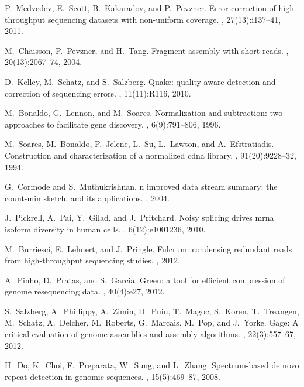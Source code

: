 \documentclass{pnastwo}
\begin{document}
\begin{article}
\begin{thebibliography}{20}
P.~Medvedev, E.~Scott, B.~Kakaradov, and P.~Pevzner.
\newblock Error correction of high-throughput sequencing datasets with
  non-uniform coverage.
, 27(13):i137--41, 2011.

M.~Chaisson, P.~Pevzner, and H.~Tang.
\newblock Fragment assembly with short reads.
, 20(13):2067--74, 2004.

D.~Kelley, M.~Schatz, and S.~Salzberg.
\newblock Quake: quality-aware detection and correction of sequencing errors.
, 11(11):R116, 2010.

M.~Bonaldo, G.~Lennon, and M.~Soares.
\newblock Normalization and subtraction: two approaches to facilitate gene
  discovery.
, 6(9):791--806, 1996.

M.~Soares, M.~Bonaldo, P.~Jelene, L.~Su, L.~Lawton, and A.~Efstratiadis.
\newblock Construction and characterization of a normalized cdna library.
, 91(20):9228--32, 1994.

G.~Cormode and S.~Muthukrishnan.
n improved data stream summary: the count-min sketch, and its
  applications.
, 2004.

J.~Pickrell, A.~Pai, Y.~Gilad, and J.~Pritchard.
\newblock Noisy splicing drives mrna isoform diversity in human cells.
, 6(12):e1001236, 2010.

M.~Burriesci, E.~Lehnert, and J.~Pringle.
\newblock Fulcrum: condensing redundant reads from high-throughput sequencing
  studies.
, 2012.

A.~Pinho, D.~Pratas, and S.~Garcia.
\newblock Green: a tool for efficient compression of genome resequencing data.
, 40(4):e27, 2012.

S.~Salzberg, A.~Phillippy, A.~Zimin, D.~Puiu, T.~Magoc, S.~Koren, T.~Treangen,
  M.~Schatz, A.~Delcher, M.~Roberts, G.~Marcais, M.~Pop, and J.~Yorke.
\newblock Gage: A critical evaluation of genome assemblies and assembly
  algorithms.
, 22(3):557--67, 2012.

H.~Do, K.~Choi, F.~Preparata, W.~Sung, and L.~Zhang.
\newblock Spectrum-based de novo repeat detection in genomic sequences.
, 15(5):469--87, 2008.


\end{thebibliography}
\end{article}
\end{document}
